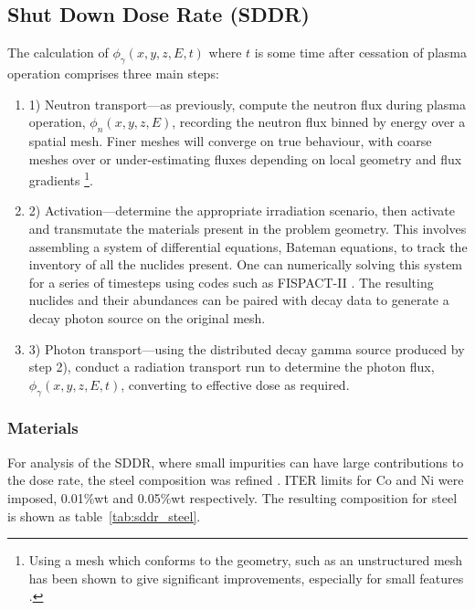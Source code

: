 
\subsection{Shut Down Dose Rate (SDDR)}
The calculation of $\phi_{\gamma}(x,y,z,E,t)$ where $t$ is some time after cessation of plasma operation comprises three main steps:
\begin{enumerate}
  \item 1) Neutron transport---as previously, compute the neutron flux during plasma operation, $\phi_{n}(x,y,z,E)$, recording the neutron flux binned by energy over a spatial mesh. Finer meshes will converge on true behaviour, with coarse meshes over or under-estimating fluxes depending on local geometry and flux gradients \footnote{Using a mesh which conforms to the geometry, such as an unstructured mesh has been shown to give significant improvements, especially for small features \cite{Eade2015}.}.
  \item 2) Activation---determine the appropriate irradiation scenario, then activate and transmutate the materials present in the problem geometry. This involves assembling a system of differential equations, Bateman equations, to track the inventory of all the nuclides present. One can numerically solving this system for a series of timesteps using codes such as FISPACT-II \cite{sublet2017a}. The resulting nuclides and their abundances can be paired with decay data to generate a decay photon source on the original mesh. 
  \item 3) Photon transport---using the distributed decay gamma source produced by step 2), conduct a radiation transport run to determine the photon flux, $\phi_{\gamma}(x,y,z,E,t)$, converting to effective dose as required.
\end{enumerate}

\subsubsection{Materials}
For analysis of the SDDR, where small impurities can have large contributions to the dose rate, the steel composition was refined \cite{Barabash16}. ITER limits for Co and Ni were imposed, 0.01\%wt and 0.05\%wt respectively. The resulting composition for steel is shown as table~\ref{tab:sddr_steel}.

